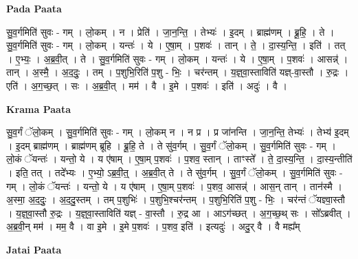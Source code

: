 \documentclass[17pt]{extarticle}
\begin{document}
\textbf{Pada Paata} \newline

सु॒व॒र्गमिति॑ सुवः - गम् । लो॒कम् । न । प्रेति॑ । जा॒न॒न्ति॒ । तेभ्यः॑ । इ॒दम् । ब्राह्म॑णम् । ब्रू॒हि॒ । ते । सु॒व॒र्गमिति॑ सुवः - गम् । लो॒कम् । यन्तः॑ । ये । ए॒षा॒म् । प॒शवः॑ । तान् । ते॒ । दा॒स्य॒न्ति॒ । इति॑ । तत् । ए॒भ्यः॒ । अ॒ब्र॒वी॒त् । ते । सु॒व॒र्गमिति॑ सुवः - गम् । लो॒कम् । यन्तः॑ । ये । ए॒षा॒म् । प॒शवः॑ । आसन्न्॑ । तान् । अ॒स्मै॒ । अ॒द॒दुः॒ । तम् । प॒शुभि॒रिति॑ प॒शु - भिः॒ । चर॑न्तम् । य॒ज्ञ्॒वा॒स्ताविति॑ यज्ञ्-वा॒स्तौ । रु॒द्रः । एति॑ । अ॒ग॒च्छ॒त् । सः । अ॒ब्र॒वी॒त् । मम॑ । वै । इ॒मे । प॒शवः॑ । इति॑ । अदुः॑ । वै ।  \newline


\textbf{Krama Paata} \newline

सु॒व॒र्गं ॅलो॒कम् । सु॒व॒र्गमिति॑ सुवः - गम् । लो॒कम् न । न प्र । प्र जा॑नन्ति । जा॒न॒न्ति॒ तेभ्यः॑ । तेभ्य॑ इ॒दम् । इ॒दम् ब्राह्म॑णम् । ब्राह्म॑णम् ब्रूहि । ब्रू॒हि॒ ते । ते सु॑व॒र्गम् । सु॒व॒र्गं ॅलो॒कम् । सु॒व॒र्गमिति॑ सुवः - गम् । लो॒कं ॅयन्तः॑ । यन्तो॒ ये । य ए॑षाम् । ए॒षा॒म् प॒शवः॑ । प॒शव॒ स्तान् । ताꣳस्ते᳚ । ते॒ दा॒स्य॒न्ति॒ । दा॒स्य॒न्तीति॑ । इति॒ तत् । तदे᳚भ्यः । ए॒भ्यो॒ ऽब्र॒वी॒त्॒ । अ॒ब्र॒वी॒त् ते । ते सु॑व॒र्गम् । सु॒व॒र्गं ॅलो॒कम् । सु॒व॒र्गमिति॑ सुवः - गम् । लो॒कं ॅयन्तः॑ । यन्तो॒ ये । य ए॑षाम् । ए॒षा॒म् प॒शवः॑ । प॒शव॒ आसन्न्॑ । आस॒न् तान् । तान॑स्मै । अ॒स्मा॒ अ॒द॒दुः॒ । अ॒द॒दु॒स्तम् । तम् प॒शुभिः॑ । प॒शुभि॒श्चर॑न्तम् । प॒शुभि॒रिति॑ प॒शु - भिः॒ । चर॑न्तं ॅयज्ञ्वा॒स्तौ । य॒ज्ञ्॒वा॒स्तौ रु॒द्रः । य॒ज्ञ्॒वा॒स्ताविति॑ यज्ञ् - वा॒स्तौ । रु॒द्र आ । आऽग॑च्छत् । अ॒ग॒च्छ॒थ् सः । सो᳚ऽब्रवीत् । अ॒ब्र॒वी॒न् मम॑ । मम॒ वै । वा इ॒मे । इ॒मे प॒शवः॑ । प॒शव॒ इति॑ । इत्यदुः॑ । अदु॒र् वै । वै मह्य᳚म् \newline

\textbf{Jatai Paata} \newline
\end{document}
